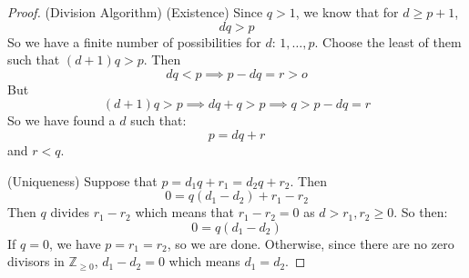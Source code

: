 \documentclass{article}
\begin{document}
\begin{itemize}
\begin{proof}
                (Division Algorithm) (Existence) Since $q > 1$, we know that for $d \geq p + 1$,
                    \begin{equation*}
                        dq > p
                    \end{equation*}
                So we have a finite number of possibilities for $d$: $1, \ldots , p$. Choose the least of them such that $(d + 1)q > p$. Then 
                    \begin{equation*}
                        dq < p \implies p - dq = r > o
                    \end{equation*}
                But 
                    \begin{equation*}
                        (d + 1)q > p \implies dq + q > p \implies q > p - dq = r
                    \end{equation*}
                So we have found a $d$ such that:
                    \begin{equation*}
                        p = dq + r
                    \end{equation*}
                and $r < q$.

                (Uniqueness) Suppose that $p = d_{1}q + r_{1} = d_{2}q + r_{2}$. Then 
                    \begin{equation*}
                        0 = q(d_{1} - d_{2}) + r_{1} - r_{2}
                    \end{equation*}
                Then $q$ divides $r_{1} - r_{2}$ which means that $r_{1} - r_{2} = 0$ as $d > r_{1}, r_{2} \geq 0$. So then:
                    \begin{equation*}
                        0 = q(d_{1} - d_{2})
                    \end{equation*}
                If $q = 0$, we have $p = r_{1} = r_{2}$, so we are done. Otherwise, since there are no zero divisors in $\mathbb{Z}_{\geq 0}$, $d_{1} - d_{2} = 0$ which means $d_{1} = d_{2}$. 
            \end{proof} 
    \end{itemize}
\end{document}
